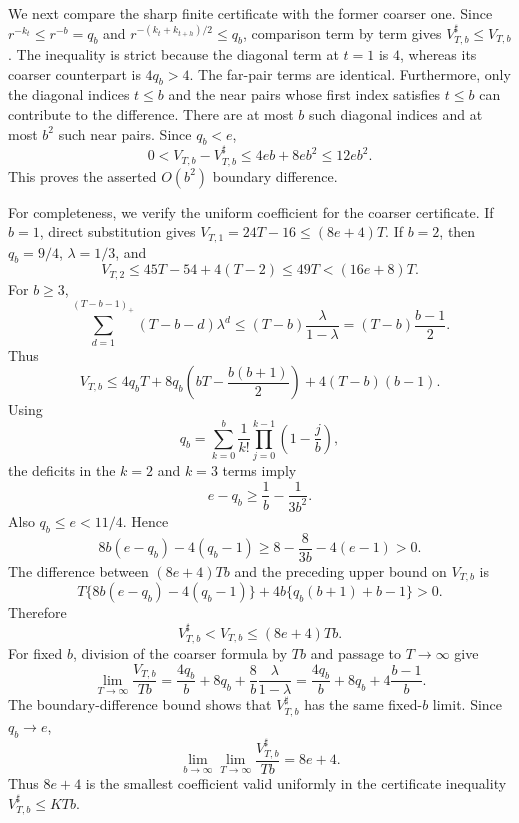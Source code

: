 We next compare the sharp finite certificate with the former coarser one. Since \(r^{-k_t}\le r^{-b}=q_b\) and \(r^{-(k_t+k_{t+h})/2}\le q_b\), comparison term by term gives \(V_{T,b}^{\sharp}\le V_{T,b}\). The inequality is strict because the diagonal term at \(t=1\) is \(4\), whereas its coarser counterpart is \(4q_b>4\). The far-pair terms are identical. Furthermore, only the diagonal indices \(t\le b\) and the near pairs whose first index satisfies \(t\le b\) can contribute to the difference. There are at most \(b\) such diagonal indices and at most \(b^2\) such near pairs. Since \(q_b<e\),
\[
0<V_{T,b}-V_{T,b}^{\sharp}
\le4eb+8eb^2
\le12eb^2.
\]
This proves the asserted \(O(b^2)\) boundary difference.

For completeness, we verify the uniform coefficient for the coarser certificate. If \(b=1\), direct substitution gives \(V_{T,1}=24T-16\le(8e+4)T\). If \(b=2\), then \(q_b=9/4\), \(\lambda=1/3\), and
\[
V_{T,2}
\le45T-54+4(T-2)
\le49T<(16e+8)T.
\]
For \(b\ge3\),
\[
\sum_{d=1}^{(T-b-1)_+}(T-b-d)\lambda^d
\le(T-b)\frac{\lambda}{1-\lambda}
=(T-b)\frac{b-1}{2}.
\]
Thus
\[
V_{T,b}\le4q_bT+8q_b\left(bT-\frac{b(b+1)}2\right)+4(T-b)(b-1).
\]
Using
\[
q_b=\sum_{k=0}^b\frac1{k!}\prod_{j=0}^{k-1}\left(1-\frac jb\right),
\]
the deficits in the \(k=2\) and \(k=3\) terms imply
\[
e-q_b\ge\frac1b-\frac1{3b^2}.
\]
Also \(q_b\le e<11/4\). Hence
\[
8b(e-q_b)-4(q_b-1)
\ge8-\frac8{3b}-4(e-1)>0.
\]
The difference between \((8e+4)Tb\) and the preceding upper bound on \(V_{T,b}\) is
\[
T\{8b(e-q_b)-4(q_b-1)\}+4b\{q_b(b+1)+b-1\}>0.
\]
Therefore
\[
V_{T,b}^{\sharp}<V_{T,b}\le(8e+4)Tb.
\]
For fixed \(b\), division of the coarser formula by \(Tb\) and passage to \(T\to\infty\) give
\[
\lim_{T\to\infty}\frac{V_{T,b}}{Tb}
=\frac{4q_b}{b}+8q_b+\frac8b\frac{\lambda}{1-\lambda}
=\frac{4q_b}{b}+8q_b+4\frac{b-1}{b}.
\]
The boundary-difference bound shows that \(V_{T,b}^{\sharp}\) has the same fixed-\(b\) limit. Since \(q_b\to e\),
\[
\lim_{b\to\infty}\lim_{T\to\infty}\frac{V_{T,b}^{\sharp}}{Tb}=8e+4.
\]
Thus \(8e+4\) is the smallest coefficient valid uniformly in the certificate inequality \(V_{T,b}^{\sharp}\le KTb\).

